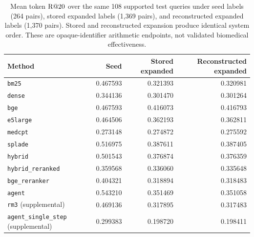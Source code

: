 \begin{table}[h]
\centering
\small
\caption{Mean token $\mathrm{R}@20$ over the same 108 supported test queries under seed labels (264 pairs), stored expanded labels (1,369 pairs), and reconstructed expanded labels (1,370 pairs). Stored and reconstructed expansion produce identical system order. These are opaque-identifier arithmetic endpoints, not validated biomedical effectiveness.}
\label{tab:endpoints}
\begin{tabular}{@{}lrrr@{}}
\toprule
Method & Seed & Stored expanded & Reconstructed expanded \\
\midrule
\texttt{bm25} & 0.467593 & 0.321393 & 0.320981 \\
\texttt{dense} & 0.344136 & 0.301470 & 0.301264 \\
\texttt{bge} & 0.467593 & 0.416073 & 0.416793 \\
\texttt{e5large} & 0.464506 & 0.362193 & 0.362811 \\
\texttt{medcpt} & 0.273148 & 0.274872 & 0.275592 \\
\texttt{splade} & 0.516975 & 0.387611 & 0.387405 \\
\texttt{hybrid} & 0.501543 & 0.376874 & 0.376359 \\
\texttt{hybrid\_reranked} & 0.359568 & 0.336060 & 0.335648 \\
\texttt{bge\_reranker} & 0.404321 & 0.318894 & 0.318483 \\
\texttt{agent} & 0.543210 & 0.351469 & 0.351058 \\
\midrule
\texttt{rm3} (supplemental) & 0.469136 & 0.317895 & 0.317483 \\
\texttt{agent\_single\_step} (supplemental) & 0.299383 & 0.198720 & 0.198411 \\
\bottomrule
\end{tabular}
\end{table}

